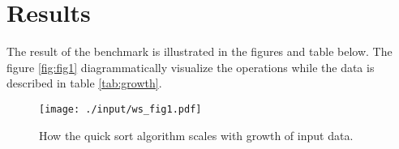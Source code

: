 \documentclass[a4paper, 11pt]{article}
\begin{document}
\clearpage
    \section*{Results}
    \label{sec:results}
    The result of the benchmark is illustrated in the figures and table below.
    The figure \autoref{fig:fig1} diagrammatically visualize the operations while the
    data is described in table \autoref{tab:growth}.

    \begin{figure}[h] %
        \centering
        \texttt{[image: ./input/ws\_fig1.pdf]} %
        \caption{How the quick sort algorithm scales with growth of input data.}%
        \label{fig:fig1} %
    \end{figure}
\end{document}
